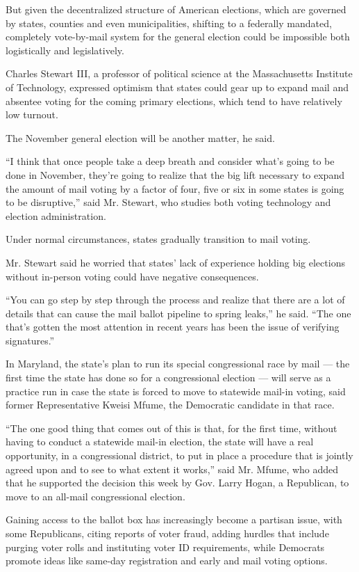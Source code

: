 But given the decentralized structure of American elections, which are
governed by states, counties and even municipalities, shifting to a
federally mandated, completely vote-by-mail system for the general
election could be impossible both logistically and legislatively.

Charles Stewart III, a professor of political science at the
Massachusetts Institute of Technology, expressed optimism that states
could gear up to expand mail and absentee voting for the coming primary
elections, which tend to have relatively low turnout.

The November general election will be another matter, he said.

``I think that once people take a deep breath and consider what's going
to be done in November, they're going to realize that the big lift
necessary to expand the amount of mail voting by a factor of four, five
or six in some states is going to be disruptive,'' said Mr. Stewart, who
studies both voting technology and election administration.

Under normal circumstances, states gradually transition to mail voting.

Mr. Stewart said he worried that states' lack of experience holding big
elections without in-person voting could have negative consequences.

``You can go step by step through the process and realize that there are
a lot of details that can cause the mail ballot pipeline to spring
leaks,'' he said. ``The one that's gotten the most attention in recent
years has been the issue of verifying signatures.''

In Maryland, the state's plan to run its special congressional race by
mail --- the first time the state has done so for a congressional
election --- will serve as a practice run in case the state is forced to
move to statewide mail-in voting, said former Representative Kweisi
Mfume, the Democratic candidate in that race.

``The one good thing that comes out of this is that, for the first time,
without having to conduct a statewide mail-in election, the state will
have a real opportunity, in a congressional district, to put in place a
procedure that is jointly agreed upon and to see to what extent it
works,'' said Mr. Mfume, who added that he supported the decision this
week by Gov. Larry Hogan, a Republican, to move to an all-mail
congressional election.

Gaining access to the ballot box has increasingly become a partisan
issue, with some Republicans, citing reports of voter fraud, adding
hurdles that include purging voter rolls and instituting voter ID
requirements, while Democrats promote ideas like same-day registration
and early and mail voting options.

